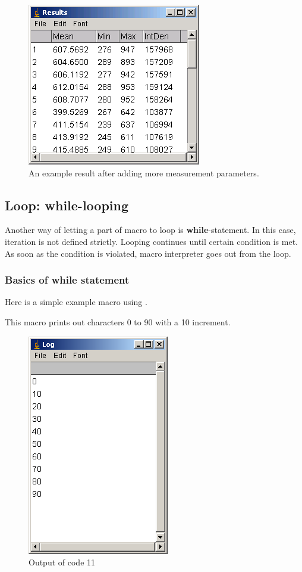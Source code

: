 \begin{figure}[htbp]
\begin{center}
\includegraphics[scale=0.5]{fig/fig2322_moreResultsTable.png}
\caption{An example result after adding more measurement parameters.}
\label{fig_MoreMeasurementPara}
\end{center}
\end{figure} 


\subsection{Loop: while-looping}

Another way of letting a part of macro to loop is \textbf{while}-statement. In this case, iteration is not defined strictly. Looping continues until certain condition is met. As soon as the condition is violated, macro interpreter goes out from the loop.

\subsubsection{Basics of while statement}
Here is a simple example macro using .

This macro prints out characters 0 to 90 with a 10 increment. 

\begin{figure}[htbp]
\begin{center}
\includegraphics[scale=0.4]{fig/fig2331_Code11out.png}
\caption{Output of code 11}
\label{fig:code11 output}
\end{center}
\end{figure} 

